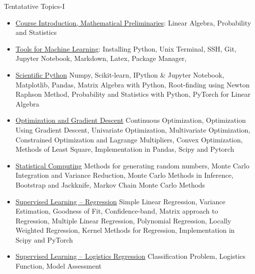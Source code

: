 \documentclass[aspectratio=169,xcolor=dvipsnames,svgnames,x11names,fleqn]{beamer}
\begin{document}
\begin{frame}{Tentatative Topics-I}
\footnotesize
\begin{itemize}
	\item \color{DarkRed} \underline{Course Introduction, Mathematical Preliminaries}: Linear Algebra, Probability and Statistics
	

		\item \color{DarkRed} \underline{Tools for Machine Learning}: Installing Python, Unix Terminal, SSH, Git, Jupyter Notebook, Markdown, Latex, Package Manager, 
	
	
 
    \item \color{DarkRed} \underline{Scientific Python} Numpy, Scikit-learn, IPython \& Jupyter Notebook, Matplotlib, Pandas, Matrix Algebra with Python,  Root-finding using Newton Raphson Method, Probability and Statistics with Python, PyTorch for Linear Algebra

    \item  \color{DarkRed} \underline{Optimization and Gradient Descent} Continuous Optimization, Optimization Using Gradient Descent,  Univariate Optimization, Multivariate Optimization, Constrained Optimization and Lagrange Multipliers, Convex Optimization, Methods of Least Square, Implementation in Pandas, Scipy and Pytorch
    
        \item \underline{Statistical Computing} Methods for generating random numbers, Monte Carlo Integration and Variance Reduction, Monte Carlo Methods in Inference, Bootstrap and Jackknife, Markov Chain Monte Carlo Methods
        
    \item   \color{DarkRed} \underline{Supervised Learning -- Regression}  Simple Linear Regression, Variance Estimation, Goodness of Fit, Confidence-band, Matrix approach to Regression, Multiple Linear Regression, Polynomial Regression, Locally Weighted Regression, Kernel Methods for Regression, Implementation in Scipy and PyTorch
    

    
    \item  \color{DarkRed} \underline{Supervised Learning -- Logistics Regression} Classification Problem, Logistics Function, Model Assessment

    
   
\end{itemize}
\end{frame}
\end{document}

